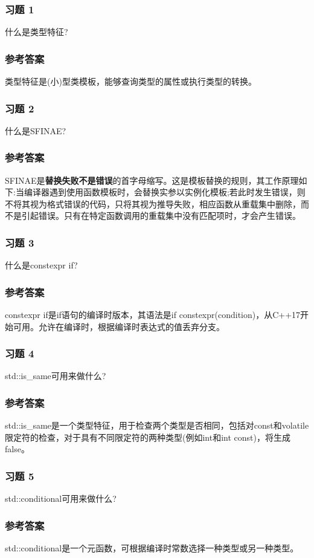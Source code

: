 \subsubsection{习题 1}

什么是类型特征?

\subsubsection{参考答案}

类型特征是(小)型类模板，能够查询类型的属性或执行类型的转换。


\subsubsection{习题 2}

什么是SFINAE?

\subsubsection{参考答案}

SFINAE是\textbf{替换失败不是错误}的首字母缩写。这是模板替换的规则，其工作原理如下:当编译器遇到使用函数模板时，会替换实参以实例化模板;若此时发生错误，则不将其视为格式错误的代码，只将其视为推导失败，相应函数从重载集中删除，而不是引起错误。只有在特定函数调用的重载集中没有匹配项时，才会产生错误。

\subsubsection{习题 3}

什么是constexpr if?

\subsubsection{参考答案}

constexpr if是if语句的编译时版本，其语法是if constexpr(condition)，从C++17开始可用。允许在编译时，根据编译时表达式的值丢弃分支。

\subsubsection{习题 4}

std::is\_same可用来做什么?

\subsubsection{参考答案}

std::is\_same是一个类型特征，用于检查两个类型是否相同，包括对const和volatile限定符的检查，对于具有不同限定符的两种类型(例如int和int const)，将生成false。

\subsubsection{习题 5}

std::conditional可用来做什么?

\subsubsection{参考答案}

std::conditional是一个元函数，可根据编译时常数选择一种类型或另一种类型。












